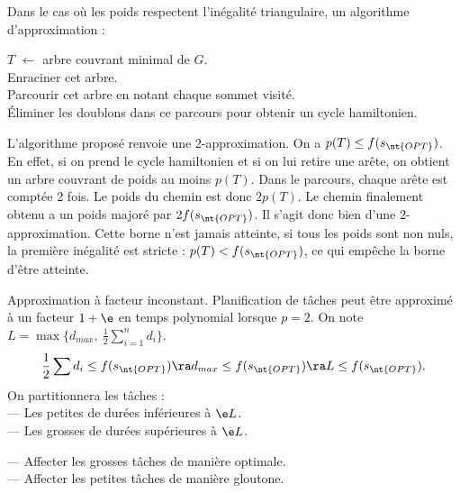\documentclass[french, 11pt]{article}
\begin{document}
\begin{prop}{}{}
    Dans le cas où les poids respectent l'inégalité triangulaire, un algorithme d'approximation :\\
    \begin{algorithm}[H]
        $T$ $\gets$ arbre couvrant minimal de $G$.\\
        Enraciner cet arbre.\\
        Parcourir cet arbre en notant chaque sommet visité.\\
        Éliminer les doublons dans ce parcours pour obtenir un cycle hamiltonien.
    \end{algorithm}
    L'algorithme proposé renvoie une $2$-approximation.
    \tcblower
    On a $p(T)\leq f(s_{\nt{OPT}})$. En effet, si on prend le cycle hamiltonien et si on lui retire une arête, on obtient un arbre couvrant de poids au moins $p(T)$. Dans le parcours, chaque arête est comptée 2 fois. Le poids du chemin est donc $2p(T)$. Le chemin finalement obtenu a un poids majoré par $2f(s_{\nt{OPT}})$. Il s'agit donc bien d'une $2$-approximation. Cette borne n'est jamais atteinte, si tous les poids sont non nuls, la première inégalité est stricte : $p(T)<f(s_{\nt{OPT}})$, ce qui empêche la borne d'être atteinte.
\end{prop}

\begin{defi}{Approximation à facteur inconstant.}{}
        Planification de tâches peut être approximé à un facteur $1+\e$ en temps polynomial lorsque $p=2$.
        \tcblower
        On note $L=\max\{d_{max}, ~ \frac{1}{2}\sum_{i=1}^n d_i\}$.
        \begin{equation*}
            \frac{1}{2}\sum d_i \leq f(s_{\nt{OPT}}) \ra d_{max} \leq f(s_{\nt{OPT}}) \ra L \leq f(s_{\nt{OPT}}).
        \end{equation*}
        On partitionnera les tâches :\\
        --- Les petites de durées inférieures à $\e L$.\\
        --- Les grosses de durées supérieures à $\e L$.
\end{defi}

\begin{defi}{}{}
    --- Affecter les grosses tâches de manière optimale.\\
    --- Affecter les petites tâches de manière gloutone.
\end{defi}
\end{document}
